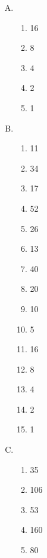 {{        %
        \begin{practices}
            \begin{enumerate}[A.]
                \item
                {
                    \begin{enumerate}[1.]
                        \item 16
                        \item 8
                        \item 4
                        \item 2
                        \item 1
                    \end{enumerate}
                }
                \item
                {
                    \begin{enumerate}[1.]
                        \item 11
                        \item 34
                        \item 17
                        \item 52
                        \item 26
                        \item 13
                        \item 40
                        \item 20
                        \item 10
                        \item 5
                        \item 16
                        \item 8
                        \item 4
                        \item 2
                        \item 1
                    \end{enumerate}
                }
                \item
                {
                    \begin{enumerate}[1.]
                        \item 35
                        \item 106
                        \item 53
                        \item 160
                        \item 80

\end{enumerate}}
\end{enumerate}
\end{practices}}}
